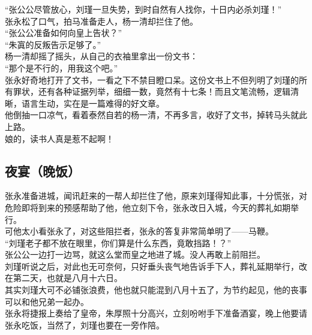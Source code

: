 \begin{multicols}{\theparacolNo}
“张公公尽管放心，刘瑾一旦失势，到时自然有人找你，十日内必杀刘瑾！”\\

张永松了口气，拍马准备走人，杨一清却拦住了他。\\

“张公公准备如何向皇上告状？”\\

“朱寘的反叛告示足够了。”\\

杨一清却摇了摇头，从自己的衣袖里拿出一份文书：\\

“那个是不行的，用我这个吧。”\\

张永好奇地打开了文书，一看之下不禁目瞪口呆。这份文书上不但列明了刘瑾的所有罪状，还有各种证据列举，细细一数，竟然有十七条！而且文笔流畅，逻辑清晰，语言生动，实在是一篇难得的好文章。\\

他倒抽一口凉气，看着泰然自若的杨一清，不再多言，收好了文书，掉转马头就此上路。\\

娘的，读书人真是惹不起啊！\\

\subsection{夜宴（晚饭）}
张永准备进城，闻讯赶来的一帮人却拦住了他，原来刘瑾得知此事，十分慌张，对危险即将到来的预感帮助了他，他立刻下令，张永改日入城，今天的葬礼如期举行。\\

可他太小看张永了，对这些阻拦者，张永的答复非常简单明了——马鞭。\\

“刘瑾老子都不放在眼里，你们算是什么东西，竟敢挡路！？”\\

张公公一边打一边骂，就这么堂而皇之地进了城。没人再敢上前阻拦。\\

刘瑾听说之后，对此也无可奈何，只好垂头丧气地告诉手下人，葬礼延期举行，改在第二天，也就是八月十六日。\\

其实刘瑾大可不必铺张浪费，他也就只能混到八月十五了，为节约起见，他的丧事可以和他兄弟一起办。\\

张永将捷报上奏给了皇帝，朱厚照十分高兴，立刻吩咐手下准备酒宴，晚上他要请张永吃饭，当然了，刘瑾也要在一旁作陪。\\


\end{multicols}

